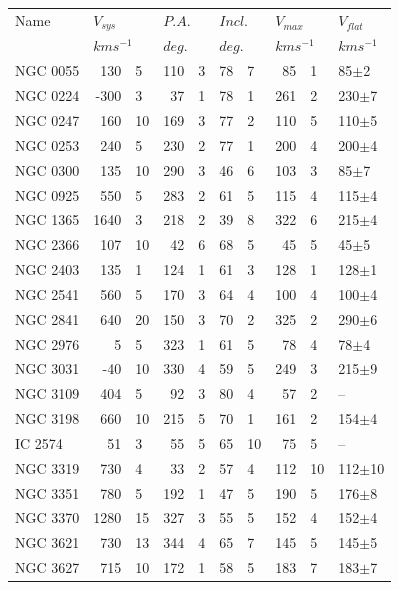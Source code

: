 \documentclass[usenatbib,useAMS]{mnras}
\begin{document}
\begin{table}
\begin{tabular}{lr@{$\pm$}lr@{$\pm$}lr@{$\pm$}lr@{$\pm$}ll}
\hline
Name & \multicolumn{2}{l}{$V_{sys}$}&\multicolumn{2}{l}{$P.A.$}&\multicolumn{2}{l}{$Incl.$}&\multicolumn{2}{l}{$V_{max}$}& $V_{flat}$ \\
&\multicolumn{2}{l}{$km s^{-1}$}&\multicolumn{2}{l}{$deg.$}&\multicolumn{2}{l}{$deg.$ }&\multicolumn{2}{l}{$km s^{-1}$}&$km s^{-1}$\\
\hline
NGC 0055	&130&5 	&110&3	 &78&7	     &85 &1	      &85$\pm$2   \\
NGC 0224	&-300&3	&37&1	 &78&1	     &261&2    &230$\pm$7	\\
NGC 0247	&160&10	&169&3	 &77&2      &110&5     &110$\pm$5	\\
NGC 0253	&240&5	&230&2	 &77&1	     &200&4    &200$\pm$4	\\
NGC 0300	&135&10	&290&3	 &46&6    &103&3	      &85$\pm$7   \\
NGC 0925	&550&5	&283&2	 &61&5	     &115&4	    &115$\pm$4	\\
NGC 1365	&1640&3	&218&2	 &39&8	     &322&6    &215$\pm$4	\\
NGC 2366	&107&10	&42&6	 &68&5	       &45&5      &45$\pm$5   \\
NGC 2403	&135&1	&124&1	 &61&3	     &128&1    &128$\pm$1	\\
NGC 2541	&560&5	&170&3	 &64&4	     &100&4    &100$\pm$4	\\
NGC 2841	&640&20	&150&3	 &70&2	     &325&2    &290$\pm$6	\\
NGC 2976	&5&5	   &323&1 &61&5	       &78&4      &78$\pm$4   \\
NGC 3031	&-40&10	&330&4	 &59&5	     &249&3    &215$\pm$9	\\
NGC 3109	&404&5	&92&3	 &80&4	     &57&2          &  --	\\
NGC 3198	&660&10	&215&5	 &70&1	     &161&2	&154$\pm$4	\\
IC 2574  	        &51&3  	&55&5	      &65&10	&75&5       &  --	\\
NGC 3319	&730&4	&33&2      &57&4    &112&10	&112$\pm$10	\\
NGC 3351	&780&5        &192&1	 &47&5	     &190&5	&176$\pm$8	\\
NGC 3370	&1280&15     &327&3	 &55&5    &152&4	     &152$\pm$4	\\
NGC 3621	&730&13	&344&4	 &65&7    &145&5	      &145$\pm$5	\\
NGC 3627	&715&10	&172&1	 &58&5	     &183&7	&183$\pm$7	\\

\end{tabular}
\end{table}
\end{document}
